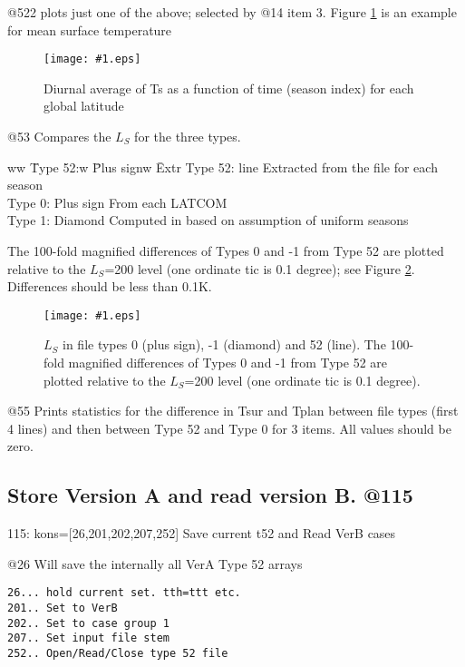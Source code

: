 \documentclass{article}  %
\newcommand{\igc}[1]{\texttt{[image: \#1.eps]}}
\begin{document}
@522 plots just one of the above; selected by  @14 item 3. Figure \ref{p522} is an example for mean surface temperature

\begin{figure}[!ht] \igc{p522}
\caption[Diurnal Mean Ts] {Diurnal average of Ts as a function of time (season index) for each global latitude 
\label{p522} } \end{figure}

@53 Compares the $L_S$ for the three types. 
 \vspace{-5.mm} \begin{tabbing}
ww \= Type 52:w \= Plus signw \= Extr \kill
 \> Type 52: \> line \>    Extracted from the file for each season \\
 \> Type 0: \>  Plus sign\>  From each LATCOM \\
 \> Type 1:  \> Diamond \>  Computed in  based on assumption of uniform seasons \\ 
\end{tabbing}
 The 100-fold magnified differences of Types 0 and -1 from Type 52  are plotted relative to the $L_S$=200 level (one ordinate tic is 0.1 degree); see Figure \ref{p53}. Differences should be less than 0.1K.

\begin{figure}[!ht] \igc{p53}
\caption[Diurnal Mean Ts] {$L_S$ in file types 0 (plus sign), -1 (diamond) and 52 (line).  The 100-fold magnified differences of Types 0 and -1 from Type 52  are plotted relative to the $L_S$=200 level (one ordinate tic is 0.1 degree).
\label{p53} } \end{figure}


@55 Prints statistics for the difference in Tsur and Tplan between file types (first 4 lines) and then between Type 52 and Type 0 for 3 items. All values should be zero.

\subsection{Store Version A and read version B. @115 \label{a115}} %
115: kons=[26,201,202,207,252]  Save current t52 and Read VerB cases

@26 Will save the internally all VerA Type 52 arrays
\vspace{-3.mm} 
\begin{verbatim}
26... hold current set. tth=ttt etc. 
201.. Set to VerB
202.. Set to case group 1
207.. Set input file stem
252.. Open/Read/Close type 52 file
\end{verbatim}
\end{document}
